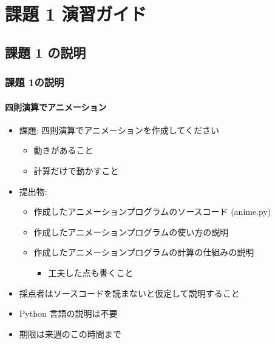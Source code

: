 %
%
\section{課題 1 演習ガイド}
\subsection{課題 1 の説明}
\begin{frame}
\frametitle{課題 1の説明}
\framesubtitle{四則演算でアニメーション}
  \begin{itemize}
\item 課題: 四則演算でアニメーションを作成してください
    \begin{itemize}
\item 動きがあること
\item 計算だけで動かすこと
    \end{itemize}
\item 提出物:
    \begin{itemize}
\item 作成したアニメーションプログラムのソースコード (anime.py)
\item 作成したアニメーションプログラムの使い方の説明
\item 作成したアニメーションプログラムの計算の仕組みの説明
      \begin{itemize}
\item 工夫した点も書くこと
      \end{itemize}
    \end{itemize}
\item 採点者はソースコードを読まないと仮定して説明すること
\item Python 言語の説明は不要
\item 期限は来週のこの時間まで
  \end{itemize}
\end{frame}
%

